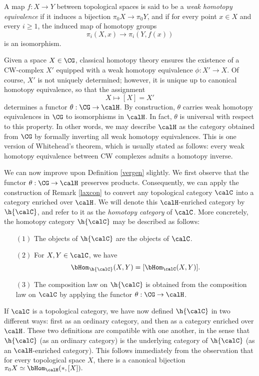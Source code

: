 \begin{definition}
A map $f: X \rightarrow Y$ between topological spaces is said to be a {\it weak homotopy equivalence}
if it induces a bijection $\pi_0 X \rightarrow \pi_0 Y$, and if 
for every point $x \in X$ and every $i \geq 1$, the induced map of homotopy groups
$$ \pi_{i}(X,x) \rightarrow \pi_i(Y,f(x))$$ is an isomorphism.
\end{definition}

Given a space $X \in \CG$, classical homotopy theory ensures the existence of a CW-complex
$X'$ equipped with a weak homotopy equivalence $\phi: X' \rightarrow X$. Of course,
$X'$ is not uniquely determined; however, it is unique up to canonical homotopy equivalence,
so that the assignment
$$ X \mapsto [X] = X'$$
determines a functor $\theta: \CG \rightarrow \calH$. By construction, $\theta$ carries
weak homotopy equivalences in $\CG$ to isomorphisms in $\calH$. In fact, $\theta$
is universal with respect to this property. In other words, we may describe $\calH$
as the category obtained from $\CG$ by formally inverting all weak homotopy equivalences.
This is one version of Whitehead's theorem, which is usually stated as follows: every weak homotopy equivalence between CW complexes admits a homotopy inverse.

We can now improve upon Definition \ref{vergen} slightly. We first observe that
the functor $\theta: \CG \rightarrow \calH$ preserves products. Consequently, we can apply the construction of Remark \ref{laxcon} to convert any topological category $\calC$ into a category enriched over $\calH$. We will denote this $\calH$-enriched category by $\h{\calC}$, and refer to it as the {\it homotopy category} of $\calC$. More concretely, the homotopy category
$\h{\calC}$ may be described as follows:
\begin{itemize}
\item[$(1)$] The objects of $\h{\calC}$ are the objects of $\calC$.
\item[$(2)$] For $X,Y \in \calC$, we have
$$ \bHom_{ \h{\calC} }(X,Y) = [ \bHom_{\calC}(X,Y) ].$$
\item[$(3)$] The composition law on $\h{\calC}$ is obtained from the composition law on
$\calC$ by applying the functor $\theta: \CG \rightarrow \calH$.
\end{itemize}

\begin{remark}
If $\calC$ is a topological category, we have now defined $\h{\calC}$ in two different ways: first as an ordinary category, and then as a category enriched over $\calH$. These two definitions are compatible with one another, in the sense that $\h{\calC}$ (as an ordinary category) is the
underlying category of $\h{\calC}$ (as an $\calH$-enriched category). This follows immediately
from the observation that for every topological space $X$, there is a canonical bijection
$\pi_0 X \simeq \bHom_{\calH}( \ast, [X] ).$
\end{remark}

